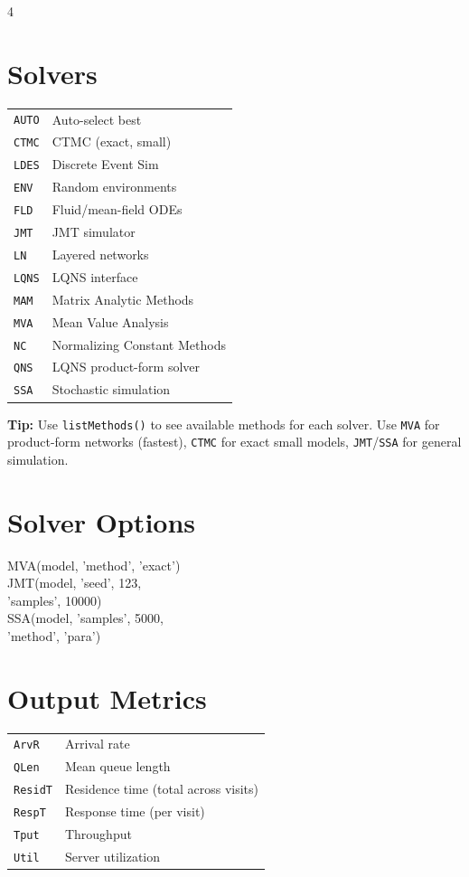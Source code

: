 \documentclass[9pt,landscape,a4paper]{extarticle}
\begin{document}
\begin{multicols}{4}
\section*{Solvers}
\begin{tabular}{@{}ll@{}}
\texttt{AUTO} & Auto-select best \\
\texttt{CTMC} & CTMC (exact, small) \\
\texttt{LDES} & Discrete Event Sim \\
\texttt{ENV} & Random environments \\
\texttt{FLD} & Fluid/mean-field ODEs \\
\texttt{JMT} & JMT simulator \\
\texttt{LN} & Layered networks \\
\texttt{LQNS} & LQNS interface \\
\texttt{MAM} & Matrix Analytic Methods \\
\texttt{MVA} & Mean Value Analysis \\
\texttt{NC} & Normalizing Constant Methods \\
\texttt{QNS} & LQNS product-form solver \\
\texttt{SSA} & Stochastic simulation \\
\end{tabular}

\begin{tipbox}
\textbf{Tip:} Use \texttt{listMethods()} to see available methods for each solver. Use \texttt{MVA} for product-form networks (fastest), \texttt{CTMC} for exact small models, \texttt{JMT}/\texttt{SSA} for general simulation.
\end{tipbox}

\section*{Solver Options}
\begin{codebox}
MVA(model, 'method', 'exact')\\
JMT(model, 'seed', 123,\\
\quad 'samples', 10000)\\
SSA(model, 'samples', 5000,\\
\quad 'method', 'para')
\end{codebox}

\section*{Output Metrics}
\begin{tabular}{@{}ll@{}}
\texttt{ArvR} & Arrival rate \\
\texttt{QLen} & Mean queue length \\
\texttt{ResidT} & Residence time (total across visits) \\
\texttt{RespT} & Response time (per visit) \\
\texttt{Tput} & Throughput \\
\texttt{Util} & Server utilization \\
\end{tabular}


\end{multicols}
\end{document}
